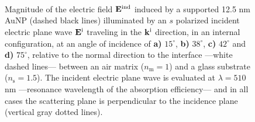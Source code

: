 \begin{figure}[t!]\centering
   \def\svgwidth{.75\textwidth}
   \footnotesize
   \\[-32.6em]
   \hspace*{-.25\textwidth}
       \begin{subfigure}{.25\textwidth}\caption{ } \label{sfig:Near:SuppObl:s:15}\end{subfigure}%
       \begin{subfigure}{.34\textwidth}\caption{ }\label{sfig:Near:SuppObl:s:38}\end{subfigure}\\[13em]
    \hspace*{-.25\textwidth}
       \begin{subfigure}{.25\textwidth}\caption{ } \label{sfig:Near:SuppObl:s:42}\end{subfigure}%
       \begin{subfigure}{.34\textwidth}\caption{ }\label{sfig:Near:SuppObl:s:75}\end{subfigure}\\[15em]
\caption[Induced Electric Field of a 12.5 nm Au NP on substrate illuminated at oblique incidence with a $s$ polarized electric field]{%
Magnitude of the electric field $\vb{E}^\text{ind}$ induced by a supported 12.5 nm AuNP (dashed black lines) illuminated by an $s$ polarized incident electric plane wave $\vb{E}^\text{i}$ traveling in the $\vb{k}^\text{i}$ direction, in an internal configuration, at an angle of incidence of \textbf{a)} $15^\circ$, \textbf{b)} $38^\circ$, \textbf{c)} $42^\circ$ and \textbf{d)} $75^\circ$, relative to the normal direction to the interface ---white dashed lines--- between an air matrix ($n_\text{m} = 1$) and a glass substrate ($n_\text{s} = 1.5$). The incident electric plane wave is evaluated at $\lambda = 510$ nm ---resonance wavelength of the absorption efficiency--- and in all cases the scattering plane is perpendicular to the incidence plane (vertical gray dotted lines).
}
 \label{fig:Near:SuppObl:s}
 \end{figure}

